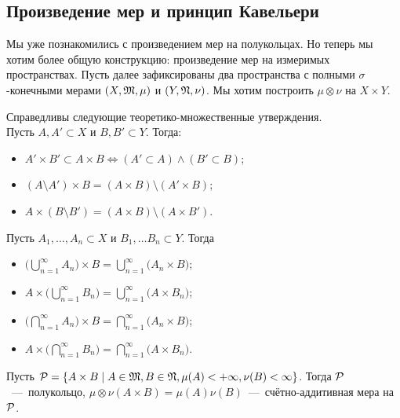 \subsection{Произведение мер и принцип Кавельери}
Мы уже познакомились с произведением мер на полукольцах. Но теперь мы хотим более общую конструкцию: произведение мер на измеримых пространствах. Пусть далее зафиксированы два пространства с полными $\sigma$-конечными мерами $(X, \mathfrak{M}, \mu)$ и $(Y, \mathfrak{N}, \nu)$. Мы хотим построить $\mu\otimes\nu$ на $X\times Y$.
\begin{fact}
    Справедливы следующие теоретико-множественные утверждения. \\ Пусть $A, A' \subset X$ и $B, B' \subset Y$. Тогда:
    \begin{itemize}
        \item $A'\times B' \subset A \times B \Longleftrightarrow (A' \subset A) \wedge (B' \subset B)$;

        \item $(A \setminus A') \times B = (A \times B) \setminus (A' \times B)$;
        \item $A \times (B \setminus B') = (A \times B) \setminus (A \times B')$.
    \end{itemize}
    Пусть $A_1, \ldots, A_n \subset X$ и $B_1, \ldots B_n \subset Y$. Тогда 
    \begin{itemize}
        \item $\biggl(\bigcup\limits_{n = 1}^\infty A_n \biggr) \times B = \bigcup\limits_{n = 1}^\infty \biggl(A_n \times B\biggr)$;
        \item $A \times \biggl(\bigcup\limits_{n = 1}^\infty B_n \biggr) = \bigcup\limits_{n = 1}^\infty \biggl(A \times B_n\biggr)$;
        \item $\biggl(\bigcap\limits_{n = 1}^\infty A_n \biggr) \times B = \bigcap\limits_{n = 1}^\infty \biggl(A_n \times B\biggr)$;
        \item $A \times \biggl(\bigcap\limits_{n = 1}^\infty B_n \biggr) = \bigcap\limits_{n = 1}^\infty \biggl(A \times B_n\biggr)$.


    \end{itemize}
\end{fact}
\begin{lemma}
    Пусть $\mathcal{P} = \{A \times B \mid A \in \mathfrak{M}, B \in \mathfrak{N}, \mu(A) < +\infty, \nu(B) < \infty\}$. Тогда
    $\mathcal{P}$~---~полукольцо, $\mu\otimes\nu(A \times B) = \mu(A)\nu(B)$~---~счётно-аддитивная мера на $\mathcal{P}$.
\end{lemma}
